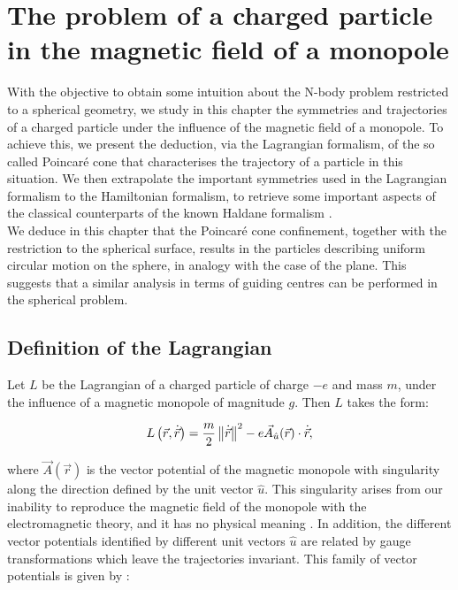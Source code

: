 \chapter{The problem of a charged particle in the magnetic field of a monopole}

With the objective to obtain some intuition about the N-body problem restricted to a spherical geometry, we study in this chapter the symmetries and trajectories of a charged particle under the influence of the magnetic field of a monopole. To achieve this, we present the deduction, via the Lagrangian formalism, of the so called Poincar\'e cone \cite{poincare} that characterises the trajectory of a particle in this situation. We then extrapolate the important symmetries used in the Lagrangian formalism to the Hamiltonian formalism, to retrieve some important aspects of the classical counterparts of the known Haldane formalism \cite{haldane}.\\

We deduce in this chapter that the Poincar\'e cone confinement, together with the restriction to the spherical surface, results in the particles describing uniform circular motion on the sphere, in analogy with the case of the plane. This suggests that a similar analysis in terms of guiding centres can be performed in the spherical problem.

\section{Definition of the Lagrangian}
Let $L$ be the Lagrangian of a charged particle of charge $-e$ and mass $m$, under the influence of a magnetic monopole of magnitude $g$. Then $L$ takes the form:

\begin{equation}
L\left( \vec{r},\dot{\vec{r}} \right) = \frac{m}{2}\left\lVert \dot{\vec{r}} \right\rVert^2 - e\vec{A}_{\hat{u}}(\vec{r})\cdot\dot{\vec{r}},
\label{eq:lagrangian}
\end{equation}

where $\vec{A}(\vec{r})$ is the vector potential of the magnetic monopole with singularity along the direction defined by the unit vector $\hat{u}$. This singularity arises from our inability to reproduce the magnetic field of the monopole with the electromagnetic theory, and it has no physical meaning \cite{haldane}. In addition, the different vector potentials identified by different unit vectors $\hat{u}$ are related by gauge transformations which leave the trajectories invariant. This family of vector potentials is given by \cite{vectorPotentials}:

